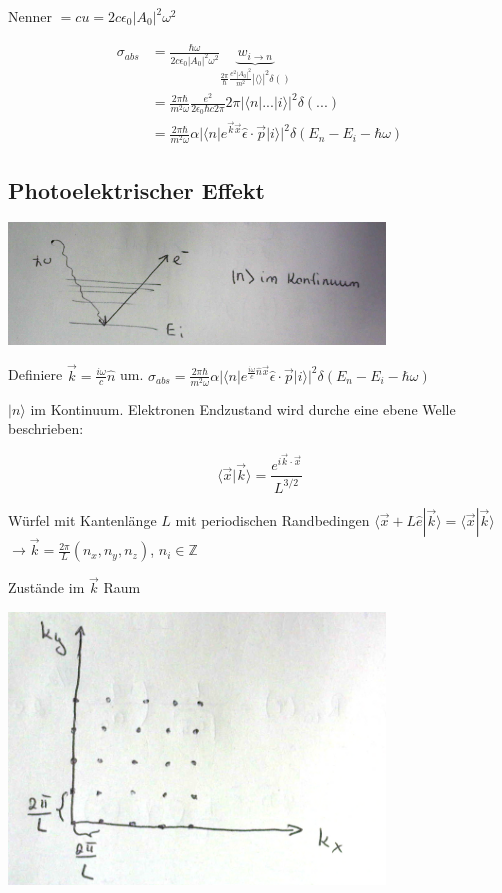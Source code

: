 Nenner \(=cu=2c\epsilon_0|A_0|^2\omega^2\)

\begin{align}
  \sigma_{abs} &= \frac{\hbar \omega}{2c\epsilon_0|A_0|^2\omega^2}\underbrace{ w_{i\rightarrow n}}_{\frac{2\pi}{\hbar}\frac{e^2|A_0|^2}{m^2}|\langle \rangle |^2\delta()}\\
  &= \frac{2\pi\hbar}{m^2\omega}\frac{e^2}{2\epsilon_0\hbar c 2\pi}2\pi |\langle n|...|i\rangle|^2\delta(...)\\
  &=\frac{2\pi\hbar}{m^2\omega}\alpha |\langle n|e^{\vec k\vec x}\hat \epsilon\cdot\vec p|i\rangle|^2\delta(E_n-E_i-\hbar\omega)
\end{align}


\subsection{Photoelektrischer Effekt}

\includegraphics[width=0.75\textwidth]{kap03_10.png}


Definiere \(\vec k=\frac{i\omega}{c}\hat n\) um. \(\sigma_{abs}=\frac{2\pi\hbar}{m^2\omega}\alpha |\langle n|e^{\frac{i\omega}{c}\hat n\vec x}\hat \epsilon\cdot\vec p|i\rangle|^2\delta(E_n-E_i-\hbar\omega)\)

\(|n\rangle\) im Kontinuum. Elektronen Endzustand wird durche eine ebene Welle beschrieben:

\[ \langle \vec x|\vec k\rangle = \frac{e^{i\vec k\cdot\vec x}}{L^{3/2}}\]

Würfel mit Kantenlänge \(L\) mit periodischen Randbedingen \(\langle \vec x + L\hat e|\vec k\rangle =\langle \vec x|\vec k\rangle \) \(\rightarrow \vec k = \frac{2\pi}{L}(n_x,n_y,n_z)\), \(n_i\in \mathbb Z\)

Zustände im \(\vec k\) Raum




\includegraphics[width=0.75\textwidth]{kap03_11.png}



